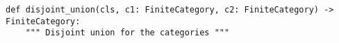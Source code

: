 \begin{verbatim}
def disjoint_union(cls, c1: FiniteCategory, c2: FiniteCategory) -> FiniteCategory:
    """ Disjoint union for the categories """
\end{verbatim}